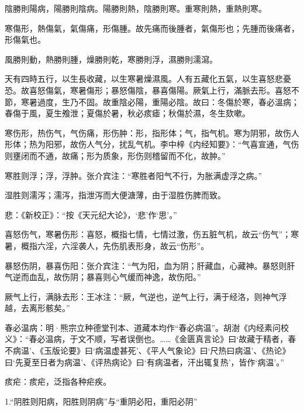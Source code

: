 \documentclass[12pt]{ctexbook}
\begin{document}

\begin{yuanwen}
陰勝則陽病，陽勝則陰病。陽勝則熱，陰勝則寒。重寒則熱，重熱則寒。

寒傷形，熱傷氣，氣傷痛，形傷腫。故先痛而後腫者，氣傷形也；先腫而後痛者，形傷氣也。

風勝則動，熱勝則腫，燥勝則乾，寒勝則浮，濕勝則濡瀉。

天有四時五行，以生長收藏，以生寒暑燥濕風。人有五藏化五氣，以生喜怒悲憂恐。故喜怒傷氣，寒暑傷形；暴怒傷陰，暴喜傷陽。厥氣上行，滿脈去形。喜怒不節，寒暑過度，生乃不固。故重陰必陽，重陽必陰。故曰：冬傷於寒，春必溫病；春傷于風，夏生飧泄；夏傷於暑，秋必痎瘧；秋傷於濕，冬生欬嗽。
\end{yuanwen}


\begin{jiaozhu}
	\item 寒伤形，热伤气，气伤痛，形伤肿：形，指形体；气，指气机。寒为阴邪，故伤人形体；热为阳邪，故伤人气分，扰乱气机。李中梓《内经知要》：“气喜宣通，气伤则壅闭而不通，故痛；形为质象，形伤则稽留而不化，故肿。”
	\item 寒胜则浮；浮，浮肿。张介宾注：“寒胜者阳气不行，为胀满虚浮之病。”
	\item 湿胜则濡泻；濡泻，指泄泻而大便溏薄，由于湿胜伤脾而致。
	\item 悲：《新校正》：“按《天元纪大论》，‘悲’作‘思’。”
	\item 喜怒伤气，寒暑伤形：喜怒，概指七情，七情过激，伤五脏气机，故云“伤气”；寒暑，概指六淫，六淫袭人，先伤肌表形身，故云“伤形”。
	\item 暴怒伤阴，暴喜伤阳：张介宾注：“气为阳，血为阴；肝藏血，心藏神。暴怒则肝气逆而血乱，故伤阴；暴喜则心气缓而神逸，故伤阳。”
	\item 厥气上行，满脉去形：王冰注：“厥，气逆也，逆气上行，满于经洛，则神气浮越，去离形骸矣。”
	\item 春必温病：明·熊宗立种德堂刊本、道藏本均作“春必病温”。胡澍《内经素问校义》：“春必温病，于文不顺，写者误倒也。……《金匮真言论》曰‘故藏于精者，春不病温’、《玉版论要》曰‘病温虚甚死’、《平人气象论》曰‘尺热曰病温’、《热论》曰‘先夏至日者为病温’、《评热病论》曰‘有病温者，汗出辄复热’，皆作‘病温’。”
	\item 痎疟：痎疟，泛指各种疟疾。
\end{jiaozhu}


1.“阴胜则阳病，阳胜则阴病”与“重阴必阳，重阳必阴”
\end{document}
